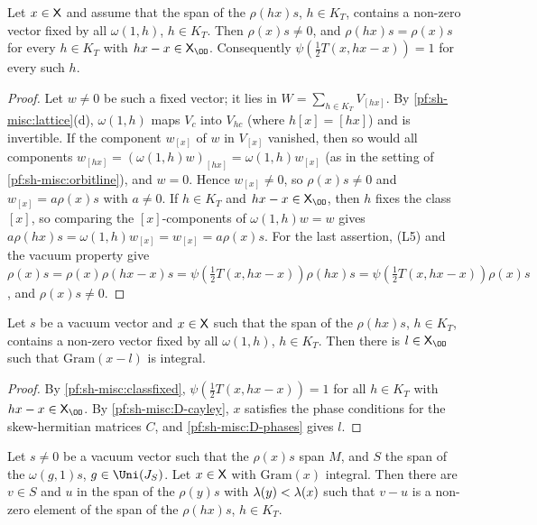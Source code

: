 \begin{lemma}\label{pf:sh-misc:classfixed}
Let $x\in\mathsf X$ and assume that the span of the $\rho(hx)s$, $h\in K_T$, contains a non-zero vector fixed by all $\omega(1,h)$,
$h\in K_T$. Then $\rho(x)s\ne0$, and $\rho(hx)s=\rho(x)s$ for every $h\in K_T$ with $hx-x\in\shmiscXO$. Consequently
$\psi(\frac12T(x,hx-x))=1$ for every such $h$.
\end{lemma}

\begin{proof}
Let $w\ne0$ be such a fixed vector; it lies in $W=\sum_{h\in K_T}V_{[hx]}$. By \cref{pf:sh-misc:lattice}(d), $\omega(1,h)$ maps $V_c$ into
$V_{hc}$ (where $h[x]=[hx]$) and is invertible. If the component $w_{[x]}$ of $w$ in $V_{[x]}$ vanished, then so would all components
$w_{[hx]}=(\omega(1,h)w)_{[hx]}=\omega(1,h)w_{[x]}$ (as in the setting of \cref{pf:sh-misc:orbitline}), and $w=0$. Hence $w_{[x]}\ne0$, so $\rho(x)s\ne0$ and
$w_{[x]}=a\rho(x)s$ with $a\ne0$. If $h\in K_T$ and $hx-x\in\shmiscXO$, then $h$ fixes the class $[x]$, so comparing the $[x]$-components of
$\omega(1,h)w=w$ gives $a\rho(hx)s=\omega(1,h)w_{[x]}=w_{[x]}=a\rho(x)s$. For the last assertion, (L5) and the vacuum property give
$\rho(x)s=\rho(x)\rho(hx-x)s=\psi(\frac12T(x,hx-x))\rho(hx)s=\psi(\frac12T(x,hx-x))\rho(x)s$, and $\rho(x)s\ne0$.
\end{proof}

\begin{lemma}\label{pf:sh-misc:intgram}
Let $s$ be a vacuum vector and $x\in\mathsf X$ such that the span of the $\rho(hx)s$, $h\in K_T$, contains a non-zero vector fixed by all
$\omega(1,h)$, $h\in K_T$. Then there is $l\in\shmiscXO$ such that $\mathrm{Gram}(x-l)$ is integral.
\end{lemma}

\begin{proof}
By \cref{pf:sh-misc:classfixed}, $\psi(\frac12T(x,hx-x))=1$ for all $h\in K_T$ with $hx-x\in\shmiscXO$. By \ref{pf:sh-misc:D-cayley}, $x$
satisfies the phase conditions for the skew-hermitian matrices $C$, and \ref{pf:sh-misc:D-phases} gives $l$.
\end{proof}

\begin{proposition}\label{pf:sh-misc:gramorbit}
Let $s\ne0$ be a vacuum vector such that the $\rho(x)s$ span $M$, and $S$ the span of the $\omega(g,1)s$, $g\in\Uni(J_S)$. Let $x\in\mathsf X$ with
$\mathrm{Gram}(x)$ integral. Then there are $v\in S$ and $u$ in the span of the $\rho(y)s$ with $\lambda(y)<\lambda(x)$ such that $v-u$ is a
non-zero element of the span of the $\rho(hx)s$, $h\in K_T$.
\end{proposition}

